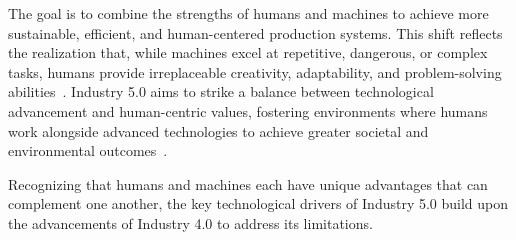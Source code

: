 The goal is to combine the strengths of humans and machines to achieve more sustainable, efficient, and human-centered production systems. This shift reflects the realization that, while machines excel at repetitive, dangerous, or complex tasks, humans provide irreplaceable creativity, adaptability, and problem-solving abilities~\cite{10577684}. Industry 5.0 aims to strike a balance between technological advancement and human-centric values, fostering environments where humans work alongside advanced technologies to achieve greater societal and environmental outcomes~\cite{GOLOVIANKO2023102}.


Recognizing that humans and machines each have unique advantages that can complement one another, the key technological drivers of Industry 5.0 build upon the advancements of Industry 4.0 to address its limitations.

